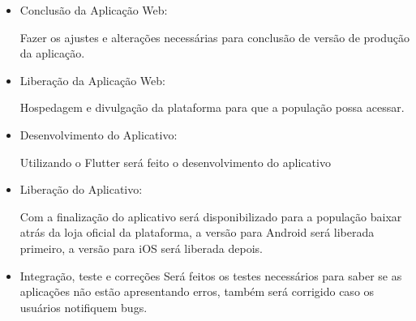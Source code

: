 \documentclass{ifto-tex}
\begin{document}
\begin{itemize}[label={$\bullet$}]
	\item Conclusão da Aplicação Web:
	
	Fazer os ajustes e alterações necessárias para conclusão de versão de produção da aplicação.
	
	\item Liberação da Aplicação Web:
	
	Hospedagem e divulgação da plataforma para que a população possa acessar.
	
	\item Desenvolvimento do Aplicativo:
	
	Utilizando o Flutter será feito o desenvolvimento do aplicativo
	
	\item Liberação do Aplicativo:
	
	Com a finalização do aplicativo será disponibilizado para a população baixar atrás da loja oficial da plataforma, a versão para Android será liberada primeiro, a versão para iOS será liberada depois.
	
	\item Integração, teste e correções
	Será feitos os testes necessários para saber se as aplicações não estão apresentando erros, também será corrigido caso os usuários notifiquem bugs.
	
	
\end{itemize}

\postextual


\end{document}
